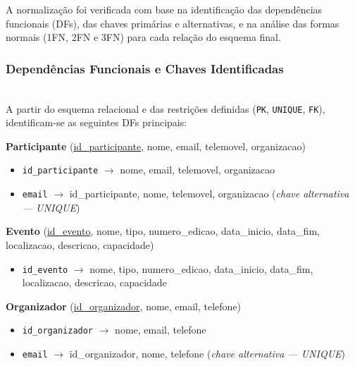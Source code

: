 \documentclass[runningheads]{llncs}
\begin{document}
                A normalização foi verificada com base na identificação das dependências
                funcionais (DFs), das chaves primárias e alternativas, e na análise das formas
                normais (1FN, 2FN e 3FN) para cada relação do esquema final.

                \subsubsection{Dependências Funcionais e Chaves Identificadas}\mbox{}\\

                A partir do esquema relacional e das restrições definidas (\texttt{PK},
                \texttt{UNIQUE}, \texttt{FK}), identificam-se as seguintes DFs principais:

                \vspace{0.2cm}
                \noindent\textbf{Participante} (\underline{id\_participante}, nome, email, telemovel, organizacao)
                \begin{itemize}
                    \item \texttt{id\_participante} $\to$ nome, email, telemovel, organizacao
                    \item \texttt{email} $\to$ id\_participante, nome, telemovel, organizacao \hfill (\textit{chave alternativa --- UNIQUE})
                \end{itemize}

                \noindent\textbf{Evento} (\underline{id\_evento}, nome, tipo, numero\_edicao, data\_inicio, data\_fim, localizacao, descricao, capacidade)
                \begin{itemize}
                    \item \texttt{id\_evento} $\to$ nome, tipo, numero\_edicao, data\_inicio, data\_fim, localizacao, descricao, capacidade
                \end{itemize}

                \noindent\textbf{Organizador} (\underline{id\_organizador}, nome, email, telefone)
                \begin{itemize}
                    \item \texttt{id\_organizador} $\to$ nome, email, telefone
                    \item \texttt{email} $\to$ id\_organizador, nome, telefone \hfill (\textit{chave alternativa --- UNIQUE})
                \end{itemize}
\end{document}
